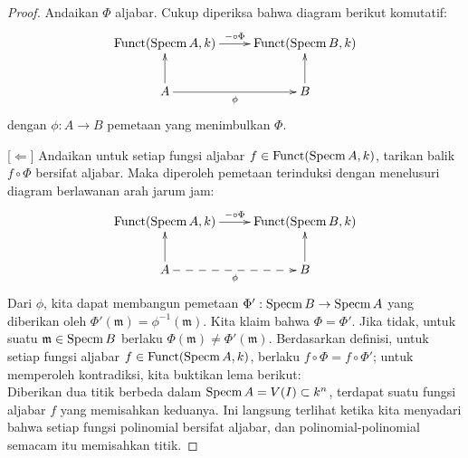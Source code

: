 \begin{proof}
Andaikan $\Phi$ aljabar. Cukup diperiksa bahwa diagram berikut komutatif:
\[ 
\xymatrix{
\mathrm{Funct}(\Specm A,k) \ar[r]^{-\circ\Phi} & \mathrm{Funct}(\Specm B,k) \\
A \ar[u] \ar[r]_{\phi} & B \ar[u]\\
}
\]
dengan $\phi:A\rightarrow B$ pemetaan yang menimbulkan $\Phi$.

[$\Leftarrow$] Andaikan untuk setiap fungsi aljabar $f\in \mathrm{Funct}(\operatorname{Specm} A,k)$, tarikan balik $f\circ\Phi$ bersifat aljabar. Maka diperoleh pemetaan terinduksi dengan menelusuri diagram berlawanan arah jarum jam:
$$
\xymatrix{
\mathrm{Funct}(\Specm A,k) \ar[r]^{-\circ\Phi} & \mathrm{Funct}(\Specm B,k) \\
A \ar[u] \ar@{-->}[r]_{\phi} & B \ar[u]\\
}
$$
Dari $\phi$, kita dapat membangun pemetaan $\Phi':\operatorname{Specm} B \rightarrow \operatorname{Specm} A$ yang diberikan oleh $\Phi'(\mathfrak{m})=\phi^{-1}(\mathfrak{m})$. Kita klaim bahwa $\Phi=\Phi'$. Jika tidak, untuk suatu $\mathfrak{m}\in \operatorname{Specm} B$ berlaku $\Phi(\mathfrak{m})\neq \Phi'(\mathfrak{m})$. Berdasarkan definisi, untuk setiap fungsi aljabar $f\in \mathrm{Funct}(\operatorname{Specm} A,k)$, berlaku $f\circ\Phi=f\circ\Phi'$; untuk memperoleh kontradiksi, kita buktikan lema berikut:\\
Diberikan dua titik berbeda dalam $\operatorname{Specm} A=V(I)\subset k^n$, terdapat suatu
fungsi aljabar $f$ yang memisahkan keduanya. Ini langsung terlihat ketika kita menyadari bahwa setiap
fungsi polinomial bersifat aljabar, dan polinomial-polinomial semacam itu memisahkan titik.
\end{proof}
	

